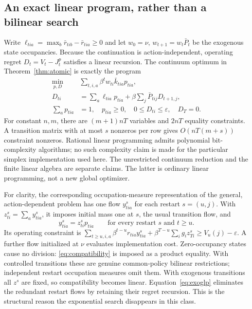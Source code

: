 \subsection{An exact linear program, rather than a bilinear search}\label{sec:exactlp}
Write $\ell_{tia}=\max_b\bar r_{tib}-\bar r_{tia}\geq0$ and let $w_0=\nu$, $w_{t+1}=w_t\bar P_t$ be the exogenous state occupancies. Because the continuation is action-independent, operating regret $D_t=V_t-J_t^p$ satisfies a linear recursion. The continuum optimum in Theorem~\ref{thm:atomic} is exactly the program
\begin{align}
 \min_{p,D}\quad &\sum_{t,i,a}\beta^t w_{ti}\bar k_{tia}p_{tia},\label{eq:exoglp}\\
 D_{ti}&=\sum_a\ell_{tia}p_{tia}+\beta\sum_j\bar P_{tij}D_{t+1,j},\nonumber\\
 \sum_ap_{tia}&=1,\quad p_{tia}\geq0,\quad 0\leq D_{ti}\leq\varepsilon,\quad D_T=0.\nonumber
\end{align}
For constant $n,m$, there are $(m+1)nT$ variables and $2nT$ equality constraints. A transition matrix with at most $s$ nonzeros per row gives $O(nT(m+s))$ constraint nonzeros. Rational linear programming admits polynomial bit-complexity algorithms; no such complexity claim is made for the particular simplex implementation used here. The unrestricted continuum reduction and the finite linear algebra are separate claims. The latter is ordinary linear programming, not a new global optimizer.

For clarity, the corresponding occupation-measure representation of the general, action-dependent problem has one flow $y^s_{tia}$ for each restart $s=(u,j)$. With $z^s_{ti}=\sum_a y^s_{tia}$, it imposes initial mass one at $s$, the usual transition flow, and
\begin{equation}\label{eq:compatibility}
 y^s_{tia}=z^s_{ti}p_{tia}\qquad\text{for every restart }s\text{ and }t\geq u.
\end{equation}
Its operating constraint is
$\sum_{t\geq u,i,a}\beta^{t-u}r_{tia}y^s_{tia}+\beta^{T-u}\sum_i g_i z^s_{Ti}\geq V_u(j)-\varepsilon$.
A further flow initialized at $\nu$ evaluates implementation cost. Zero-occupancy states cause no division: \eqref{eq:compatibility} is imposed as a product equality. With controlled transitions these are genuine common-policy bilinear restrictions; independent restart occupation measures omit them. With exogenous transitions all $z^s$ are fixed, so compatibility becomes linear. Equation~\eqref{eq:exoglp} eliminates the redundant restart flows by retaining their regret recursion. This is the structural reason the exponential search disappears in this class.

